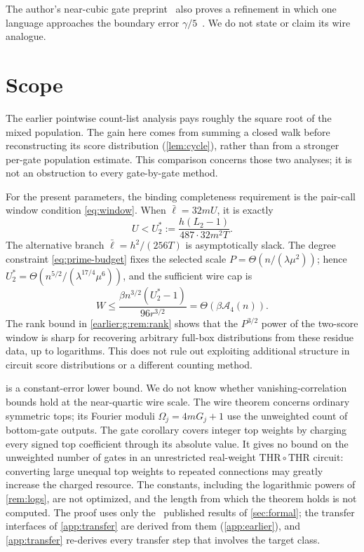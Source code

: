 \documentclass[11pt,letterpaper]{article}
\theoremstyle{definition}
\theoremstyle{remark}
\newcommand{\THR}{\mathrm{THR}}
\begin{document}
The author's near-cubic gate preprint~\cite{NagCG} also proves a refinement in which one
language approaches the boundary error \(\gamma/5\)~\cite[Theorem~11.3
and Corollary~11.4]{NagCG}. We do not state or claim its wire analogue.

\section{Scope}\label{sec:scope}

The earlier pointwise count-list analysis pays roughly the square root of the mixed population. The gain here comes from summing a closed walk before reconstructing its score distribution (\cref{lem:cycle}), rather than from a stronger per-gate population estimate. This comparison concerns those two analyses; it is not an obstruction to every gate-by-gate method.

For the present parameters, the binding completeness requirement is the pair-call window condition \eqref{eq:window}. When \(\bar\ell=32mU\), it is exactly
\[
 U<U_2^*:=\frac{h(L_2-1)}{487\cdot32m^2T}.
\]
The alternative branch \(\bar\ell=h^2/(256T)\) is asymptotically slack. The degree constraint \eqref{eq:prime-budget} fixes the selected scale \(P=\Theta(n/(\lambda\mu^2))\); hence \(U_2^*=\Theta(n^{5/2}/(\lambda^{17/4}\mu^6))\), and the sufficient wire cap is
\[
 W\le\frac{\beta n^{3/2}(U_2^*-1)}{96r^{3/2}}
   =\Theta(\beta\mathcal A_4(n)).
\]
The rank bound in \cref{earlier:g:rem:rank} shows that the \(P^{3/2}\) power of the two-score window is sharp for recovering arbitrary full-box distributions from these residue data, up to logarithms. This does not rule out exploiting additional structure in circuit score distributions or a different counting method.

 is a constant-error lower bound. We do not know
whether vanishing-correlation bounds hold at the near-quartic wire
scale. The wire theorem concerns ordinary symmetric tops; its Fourier
moduli \(\Omega_j=4mG_j+1\) use the unweighted count of bottom-gate
outputs. The gate corollary covers integer top weights by charging every signed
top coefficient through its absolute value. It gives no bound on
the unweighted number of gates in an unrestricted real-weight
\(\THR\circ\THR\) circuit: converting large unequal top weights
to repeated connections may greatly increase the charged resource. The constants, including the
logarithmic powers of \cref{rem:logs}, are not optimized, and the
length from which the theorem holds is not computed. The proof uses only the \publishedinputcount\ published results of \cref{sec:formal}; the transfer interfaces of \cref{app:transfer} are derived from them (\cref{app:earlier}), and \cref{app:transfer} re-derives every transfer step that involves the target class.
\end{document}
